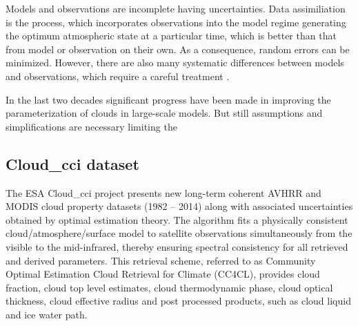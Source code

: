 Models and observations are incomplete having uncertainties. Data assimiliation is the process,
which incorporates observations into the model regime generating the optimum atmospheric 
state at a particular time, which is better than that from model or observation on their own.
As a consequence, random errors can be minimized. However, there are also many systematic 
differences between models and observations, which require a careful treatment \cite{Forbes2015}.

\cite{IPCC2013}
In the last two decades significant progress have been made in improving the parameterization 
of clouds in large-scale models. But still assumptions and simplifications are necessary 
limiting the


\subsection{Cloud\_cci dataset}\label{sec:cloudcci}

The ESA Cloud\_cci project presents new long-term coherent AVHRR and MODIS cloud property datasets 
(1982 – 2014) along with associated uncertainties obtained by optimal estimation theory. 
The algorithm fits a physically consistent cloud/atmosphere/surface model to satellite observations 
simultaneously from the visible to the mid-infrared, thereby ensuring spectral consistency for 
all retrieved and derived parameters. This retrieval scheme, referred to as Community Optimal 
Estimation Cloud Retrieval for Climate (CC4CL), provides cloud fraction, cloud top level estimates, 
cloud thermodynamic phase, cloud optical thickness, cloud effective radius and post processed products, 
such as cloud liquid and ice water path.
